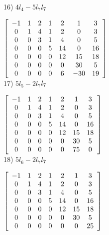 \documentclass{article}
\begin{document}
16) $4l_{4} - 5l_{7} $\to$ l_{7}\\ 
\newline$

$\left[\begin{array}{ccccccc}
-1 &  1 &  2 &  1 &  2 &  1 &  3 \\
0  &  1 &  4 &  1 &  2 &  0 &  3 \\
0  &  0 &  3 &  1 &  4 &  0 &  5 \\     
0  &  0 &  0 &  5 &  14&  0 &  16\\ 
0  &  0 &  0 &  0 &  12& 15 &  18\\ 
0  &  0 &  0 &  0 &  0&  30 &   5\\ 
0  &  0 &  0 &  0 &  6& -30 &  19\\ 
 \end{array}\right]\\
  \newline$\\

17) $5l_{5} - 2l_{7} $\to$ l_{7}\\ 
\newline$

$\left[\begin{array}{ccccccc}
-1 &  1 &  2 &  1 &  2 &  1 &  3 \\
0  &  1 &  4 &  1 &  2 &  0 &  3 \\
0  &  0 &  3 &  1 &  4 &  0 &  5 \\     
0  &  0 &  0 &  5 &  14&  0 &  16\\ 
0  &  0 &  0 &  0 &  12& 15 &  18\\ 
0  &  0 &  0 &  0 &  0&  30 &   5\\ 
0  &  0 &  0 &  0 &  0&  75 &  0\\ 
 \end{array}\right]\\
  \newline$\\
  
18) $5l_{6} - 2l_{7} $\to$ l_{7}\\ 
\newline$

$\left[\begin{array}{ccccccc}
-1 &  1 &  2 &  1 &  2 &  1 &  3 \\
0  &  1 &  4 &  1 &  2 &  0 &  3 \\
0  &  0 &  3 &  1 &  4 &  0 &  5 \\     
0  &  0 &  0 &  5 &  14&  0 &  16\\ 
0  &  0 &  0 &  0 &  12& 15 &  18\\ 
0  &  0 &  0 &  0 &  0&  30 &   5\\ 
0  &  0 &  0 &  0 &  0&  0 &  25\\ 
 \end{array}\right]\\
  \newline$\\
  
\end{document}
